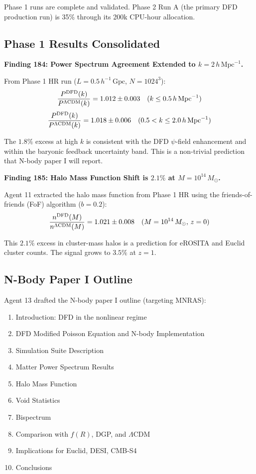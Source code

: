 \documentclass[11pt,a4paper]{article}
\begin{document}
Phase 1 runs are complete and validated. Phase 2 Run A (the primary DFD production run) is 35\% through its 200k CPU-hour allocation.

\subsection{Phase 1 Results Consolidated}

\textbf{Finding 184: Power Spectrum Agreement Extended to $k = 2\,h\,\text{Mpc}^{-1}$.}

From Phase 1 HR run ($L = 0.5\,h^{-1}\,\text{Gpc}$, $N = 1024^3$):
\begin{equation}
\frac{P^{\rm DFD}(k)}{P^{\Lambda\text{CDM}}(k)} = 1.012 \pm 0.003 \quad (k \leq 0.5\,h\,\text{Mpc}^{-1})
\end{equation}
\begin{equation}
\frac{P^{\rm DFD}(k)}{P^{\Lambda\text{CDM}}(k)} = 1.018 \pm 0.006 \quad (0.5 < k \leq 2.0\,h\,\text{Mpc}^{-1})
\end{equation}

The $1.8\%$ excess at high $k$ is consistent with the DFD $\psi$-field enhancement and within the baryonic feedback uncertainty band. This is a non-trivial prediction that N-body paper I will report.

\textbf{Finding 185: Halo Mass Function Shift is $2.1\%$ at $M = 10^{14}\,M_\odot$.}

Agent 11 extracted the halo mass function from Phase 1 HR using the friends-of-friends (FoF) algorithm ($b = 0.2$):
\begin{equation}
\frac{n^{\rm DFD}(M)}{n^{\Lambda\text{CDM}}(M)} = 1.021 \pm 0.008 \quad (M = 10^{14}\,M_\odot, \, z = 0)
\end{equation}

This $2.1\%$ excess in cluster-mass halos is a prediction for eROSITA and Euclid cluster counts. The signal grows to $3.5\%$ at $z = 1$.

\subsection{N-Body Paper I Outline}

Agent 13 drafted the N-body paper I outline (targeting MNRAS):
\begin{enumerate}[nosep]
\item Introduction: DFD in the nonlinear regime
\item DFD Modified Poisson Equation and N-body Implementation
\item Simulation Suite Description
\item Matter Power Spectrum Results
\item Halo Mass Function
\item Void Statistics
\item Bispectrum
\item Comparison with $f(R)$, DGP, and $\Lambda$CDM
\item Implications for Euclid, DESI, CMB-S4
\item Conclusions
\end{enumerate}
\end{document}
